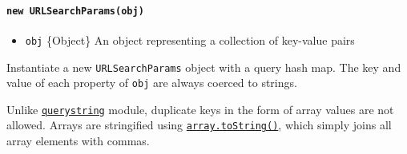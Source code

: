 \begin{Shaded}
\begin{Highlighting}[]
\OperatorTok{;}

\OperatorTok{=}  \NormalTok{(}\NormalTok{)}\OperatorTok{;}
\NormalTok{(}\NormalTok{))}\OperatorTok{;}
\NormalTok{())}\OperatorTok{;}

\OperatorTok{=}  \NormalTok{(}\NormalTok{)}\OperatorTok{;}
\NormalTok{())}\OperatorTok{;}
\end{Highlighting}
\end{Shaded}

\paragraph{\texorpdfstring{\texttt{new\ URLSearchParams(obj)}}{new URLSearchParams(obj)}}\label{new-urlsearchparamsobj}

\begin{itemize}
\tightlist
\item
  \texttt{obj} \{Object\} An object representing a collection of
  key-value pairs
\end{itemize}

Instantiate a new \texttt{URLSearchParams} object with a query hash map.
The key and value of each property of \texttt{obj} are always coerced to
strings.

Unlike \href{querystring.md}{\texttt{querystring}} module, duplicate
keys in the form of array values are not allowed. Arrays are stringified
using
\href{https://developer.mozilla.org/en-US/docs/Web/JavaScript/Reference/Global_Objects/Array/toString}{\texttt{array.toString()}},
which simply joins all array elements with commas.

